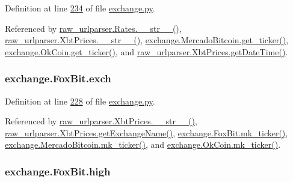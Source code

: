 Definition at line \hyperlink{exchange_8py_source_l00234}{234} of file \hyperlink{exchange_8py_source}{exchange.\+py}.



Referenced by \hyperlink{raw__urlparser_8py_source_l00038}{raw\+\_\+urlparser.\+Rates.\+\_\+\+\_\+str\+\_\+\+\_\+()}, \hyperlink{raw__urlparser_8py_source_l00074}{raw\+\_\+urlparser.\+Xbt\+Prices.\+\_\+\+\_\+str\+\_\+\+\_\+()}, \hyperlink{exchange_8py_source_l00306}{exchange.\+Mercado\+Bitcoin.\+get\+\_\+ticker()}, \hyperlink{exchange_8py_source_l00371}{exchange.\+Ok\+Coin.\+get\+\_\+ticker()}, and \hyperlink{raw__urlparser_8py_source_l00059}{raw\+\_\+urlparser.\+Xbt\+Prices.\+get\+Date\+Time()}.

\subsubsection[{\texorpdfstring{exch}{exch}}]{\setlength{\rightskip}{0pt plus 5cm}exchange.\+Fox\+Bit.\+exch}\hypertarget{classexchange_1_1_fox_bit_a3922433dcfe54e39c3c0da12fa252658}{}\label{classexchange_1_1_fox_bit_a3922433dcfe54e39c3c0da12fa252658}


Definition at line \hyperlink{exchange_8py_source_l00228}{228} of file \hyperlink{exchange_8py_source}{exchange.\+py}.



Referenced by \hyperlink{raw__urlparser_8py_source_l00074}{raw\+\_\+urlparser.\+Xbt\+Prices.\+\_\+\+\_\+str\+\_\+\+\_\+()}, \hyperlink{raw__urlparser_8py_source_l00068}{raw\+\_\+urlparser.\+Xbt\+Prices.\+get\+Exchange\+Name()}, \hyperlink{exchange_8py_source_l00245}{exchange.\+Fox\+Bit.\+mk\+\_\+ticker()}, \hyperlink{exchange_8py_source_l00320}{exchange.\+Mercado\+Bitcoin.\+mk\+\_\+ticker()}, and \hyperlink{exchange_8py_source_l00385}{exchange.\+Ok\+Coin.\+mk\+\_\+ticker()}.

\subsubsection[{\texorpdfstring{high}{high}}]{\setlength{\rightskip}{0pt plus 5cm}exchange.\+Fox\+Bit.\+high}\hypertarget{classexchange_1_1_fox_bit_a4f6dfaecbcc17ceadddf52d266d9c00d}{}\label{classexchange_1_1_fox_bit_a4f6dfaecbcc17ceadddf52d266d9c00d}


